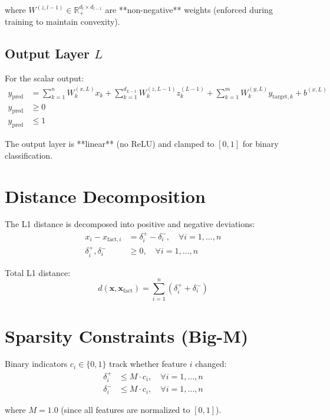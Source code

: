 \documentclass{article}
\begin{document}
where $W^{(z,l-1)} \in \mathbb{R}_+^{d_l \times d_{l-1}}$ are **non-negative** weights (enforced during training to maintain convexity).

\subsection{Output Layer $L$}

For the scalar output:
\begin{align}
y_{\text{pred}} &= \sum_{k=1}^{n} W_{k}^{(x,L)} x_k + \sum_{k=1}^{d_{L-1}} W_{k}^{(z,L-1)} z_k^{(L-1)} + \sum_{k=1}^{m} W_{k}^{(y,L)} y_{\text{target},k} + b^{(x,L)} \\
y_{\text{pred}} &\geq 0 \\
y_{\text{pred}} &\leq 1
\end{align}

The output layer is **linear** (no ReLU) and clamped to $[0,1]$ for binary classification.

\section{Distance Decomposition}

The L1 distance is decomposed into positive and negative deviations:
\begin{align}
x_i - x_{\text{fact},i} &= \delta_i^+ - \delta_i^-, \quad \forall i = 1, \ldots, n \\
\delta_i^+, \delta_i^- &\geq 0, \quad \forall i = 1, \ldots, n
\end{align}

Total L1 distance:
\begin{equation}
d(\mathbf{x}, \mathbf{x}_{\text{fact}}) = \sum_{i=1}^{n} (\delta_i^+ + \delta_i^-)
\end{equation}

\section{Sparsity Constraints (Big-M)}

Binary indicators $c_i \in \{0,1\}$ track whether feature $i$ changed:
\begin{align}
\delta_i^+ &\leq M \cdot c_i, \quad \forall i = 1, \ldots, n \\
\delta_i^- &\leq M \cdot c_i, \quad \forall i = 1, \ldots, n
\end{align}

where $M = 1.0$ (since all features are normalized to $[0,1]$).
\end{document}
